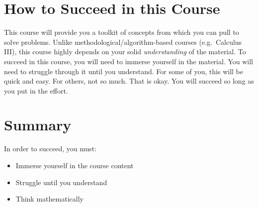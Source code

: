 \documentclass[main.tex]{subfiles}
\begin{document}
\section{How to Succeed in this Course}

This course will provide you a toolkit of concepts from which you can pull to solve problems. Unlike methodological/algorithm-based courses (e.g.\ Calculus III), this course highly depends on your solid \textit{understanding} of the material. To succeed in this course, you will need to immerse yourself in the material. You will need to struggle through it until you understand. For some of you, this will be quick and easy. For others, not so much. That is okay. You will succeed so long as you put in the effort.

\section{Summary}

In order to succeed, you must:
\begin{itemize}
	\item Immerse yourself in the course content
	\item Struggle until you understand
	\item Think mathematically
\end{itemize}
\end{document}
